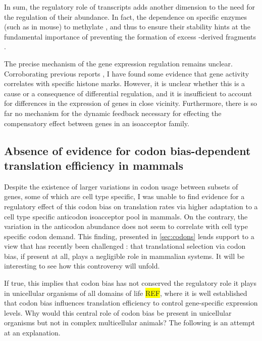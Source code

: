 In sum, the regulatory role of \trna transcripts adds another dimension to the
need for the regulation of their abundance. In fact, the dependence on specific
enzymes (such as  in mouse) to methylate \trna[s], and thus
to ensure their stability hints at the fundamental importance of preventing the
formation of excess \trna-derived fragments \citep{Blanco:2014}.

The precise mechanism of the \trna gene expression regulation remains unclear.
Corroborating previous reports \citep{Oler:2010}, I have found some evidence
that \trna gene activity correlates with specific histone marks. However, it is
unclear whether this is a cause or a consequence of differential regulation, and
it is insufficient to account for differences in the expression of \trna genes
in close vicinity. Furthermore, there is so far no mechanism for the dynamic
feedback necessary for effecting the compensatory effect between genes in an
isoacceptor family.

\subsection{Absence of evidence for codon bias-dependent translation efficiency in mammals}

Despite the existence of larger variations in codon usage between subsets of
genes, some of which are cell type specific, I was unable to find evidence for a
regulatory effect of this codon bias on translation rates via higher adaptation
to a cell type specific \trna anticodon isoacceptor pool in mammals. On the
contrary, the variation in the \trna anticodon abundance does not seem to
correlate with cell type specific codon demand. This finding, presented in
\cref{sec:codons} lends support to a view that has recently been challenged
\citep{Gingold:2014,Wilusz:2015}: that translational selection via codon bias,
if present at all, plays a negligible role in mammalian systems. It will be
interesting to see how this controversy will unfold.

If true, this implies that codon bias has not conserved the regulatory role it
plays in unicellular organisms of all domains of life \colorbox{yellow}{REF},
where it is well established that codon bias influences translation efficiency
to control gene-specific expression levels. Why would this central role of codon
bias be present in unicellular organisms but not in complex multicellular
animals? The following is an attempt at an explanation.


